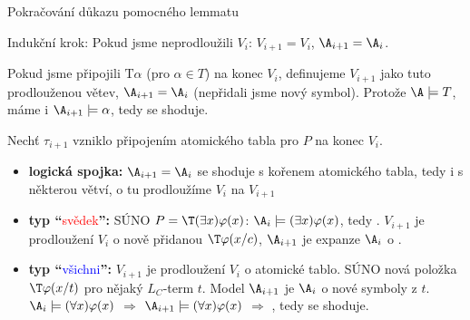 \documentclass{beamer}
\begin{document}
\begin{frame}{Pokračování důkazu pomocného lemmatu}

    \vspace{-6pt}\pause
    \alert{Indukční krok:} Pokud jsme neprodloužili $V_i$: $V_{i+1}=V_i$, $\A_{i+1}=\A_i$.

    \vspace{-3pt}

    \pause
    Pokud jsme připojili $\mathrm{T}\alpha$ (pro $\alpha\in T$) na konec $V_i$, definujeme $V_{i+1}$ jako tuto prodlouženou větev, $\A_{i+1}=\A_i$ (nepřidali jsme nový symbol). Protože $\A\models T$, máme i $\A_{i+1}\models\alpha$, tedy se shoduje.
  
    \pause
    Nechť $\tau_{i+1}$ vzniklo připojením atomického tabla pro $P$ na konec $V_i$.

    \vspace{-3pt}
    
    \pause
    \begin{itemize}
        \item \textbf{logická spojka:} $\A_{i+1}=\A_i$ se shoduje s kořenem atomického tabla, tedy i s některou větví, o tu prodloužíme $V_i$ na $V_{i+1}$\pause
        
        \medskip

        \item \textbf{typ ``}\textcolor{red}{svědek}\textbf{'':} SÚNO $P=\T(\exists x)\varphi(x)$: $\A_i\models(\exists x)\varphi(x)$, tedy . $V_{i+1}$ je prodloužení $V_i$ o nově přidanou $\T\varphi(x/c)$, $\A_{i+1}$ je expanze $\A_i$ o .\pause
        
        \medskip

        \item \textbf{typ ``}\textcolor{blue}{všichni}\textbf{'':} $V_{i+1}$ je prodloužení $V_i$ o atomické tablo. SÚNO nová položka $\T\varphi(x/t)$ pro nějaký $L_C$-term $t$. \pause 
        Model $\A_{i+1}$ je  $\A_i$ o nové symboly z $t$.    
        $\A_i\models(\forall x)\varphi(x)$ $\Rightarrow$ $\A_{i+1}\models(\forall x)\varphi(x)$ $\Rightarrow$ , tedy se shoduje. \hfill\qedsymbol
    \end{itemize}

\end{frame}
\end{document}
